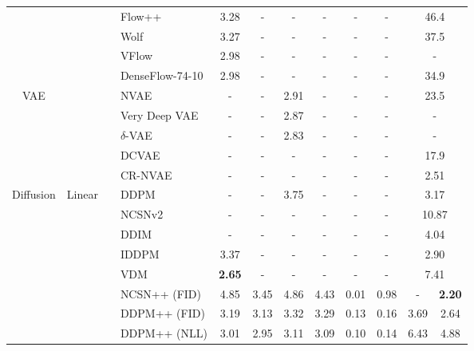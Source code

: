 \documentclass{article}
\theoremstyle{definition}
\theoremstyle{remark}
\begin{document}
\begin{table*}[t]
\begin{adjustbox}{max width=\textwidth}
\begin{tabular}{cccl|cccccccc}
				&  	&											& Flow++ \cite{ho2019flow++} & 3.28 & - & - & - & - & - &  \multicolumn{2}{c}{46.4}  \\
				&  	&											& Wolf \cite{ma2020decoupling}	 & 3.27 & - & - & - & - & - &  \multicolumn{2}{c}{37.5}  \\
				&  	&											& VFlow \cite{chen2020vflow}	 & 2.98 & - & - & - & - & - &  \multicolumn{2}{c}{-}  \\
				&  	&											& DenseFlow-74-10 \cite{grcic2021densely}	 & 2.98 & - & - & - & - & - &  \multicolumn{2}{c}{34.9}  \\	 \midrule
				\multirow{5}{*}{VAE}  &  	&											& NVAE \cite{vahdat2020nvae}	 & - & - & 2.91  & - & - & - &  \multicolumn{2}{c}{23.5}  \\
				&  	&											& Very Deep VAE \cite{child2020very}	 & - & - & 2.87 & - & - & - &  \multicolumn{2}{c}{-}  \\
				&  	&											& $\delta$-VAE \cite{razavi2018preventing}	 & - & - & 2.83 & - & - & - &  \multicolumn{2}{c}{-}  \\
				&  	&											& DCVAE \cite{parmar2021dual}	 & - & - & - & - & - & - &  \multicolumn{2}{c}{17.9}  \\
				&  	&											& CR-NVAE \cite{sinha2021consistency} 	 & - & - & - & - & - & - &  \multicolumn{2}{c}{2.51}  \\	 \midrule
				\multirow{19}{*}[-1.5em]{Diffusion}  & \multirow{9}{*}{Linear} 	&						& DDPM \cite{ho2020denoising}	 & - & - & 3.75 & - & - & - &\multicolumn{2}{c}{3.17} \\	
				&						&											& NCSNv2 \cite{song2020improved}	& - & - & - & - & - & - &\multicolumn{2}{c}{10.87} \\	
				&						&											& DDIM \cite{song2020denoising}	 & - & - & - & - & - & - &\multicolumn{2}{c}{4.04} \\
				&						&											& IDDPM \cite{nichol2021improved}	 & 3.37 & - & - & - & - & - &\multicolumn{2}{c}{2.90} \\	
				&						&											& VDM \cite{kingma2021variational}	 & \textbf{2.65} & - & - & - & - & - &\multicolumn{2}{c}{7.41} \\	
				&						&											& NCSN++ (FID) \cite{song2020score}	 & 4.85 & 3.45 & 4.86 & 4.43 & 0.01 & 0.98 & - 		& \textbf{2.20} \\		
				& 						&											& DDPM++ (FID) \cite{song2020score}	 & 3.19 & 3.13 & 3.32 & 3.29 & 0.13 & 0.16 & 3.69 	& 2.64		 \\
				& 						&											& DDPM++ (NLL) \cite{song2021maximum}	 & 3.01 & 2.95 & 3.11 & 3.09 & 0.10 & 0.14 & 6.43 	& 4.88 		\\

\end{tabular}
\end{adjustbox}
\end{table*}
\end{document}
